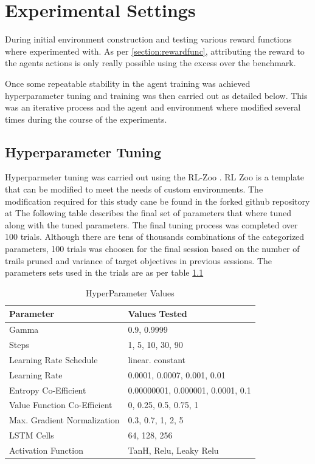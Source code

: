 \documentclass[oneside,12pt]{Classes/RoboticsLaTeX}
\begin{document}
\chapter{Experimental Settings} \label{chap:experimental}
During initial environment construction and testing various reward functions where experimented with. As per \ref{section:rewardfunc}, attributing the reward to the agents actions is only really possible using the excess over the benchmark. 

Once some repeatable stability in the agent training was achieved hyperparameter tuning and training was then carried out as detailed below. This was an iterative process and the agent and environment where modified several times during the course of the experiments.

\section{Hyperparameter Tuning}
Hyperparmeter tuning was carried out using the RL-Zoo \citep{rl-zoo}. RL Zoo is a template that can be modified to meet the needs of custom environments.  The modification required for this study cane be found in the forked github repository  at \citet{KeithBinesRLZoo2021}  The following table describes the final set of parameters that where tuned along with the tuned parameters. The final tuning process was completed over 100 trials. Although there are tens of thousands combinations of the categorized parameters, 100 trials was choosen for the final session based on the number of trails pruned and variance of target objectives in previous sessions. The parameters sets used in the trials are as per table \ref{table:hyperparamvals}

\begin{table} [h]
\begin{tabular}{|l|l|}
\hline
\textbf{Parameter} & \textbf{Values Tested }\\
\hline
Gamma & 0.9, 0.9999\\
Steps & 1, 5, 10, 30, 90\\
\hline
Learning Rate Schedule & linear. constant \\
\hline
Learning Rate & 0.0001, 0.0007, 0.001, 0.01\\
\hline
Entropy Co-Efficient & 0.00000001, 0.000001, 0.0001, 0.1\\
\hline
Value Function Co-Efficient & 0, 0.25, 0.5, 0.75, 1\\
\hline
Max. Gradient Normalization & 0.3, 0.7, 1, 2, 5\\
\hline
LSTM Cells & 64, 128, 256\\
\hline
Activation Function & TanH, Relu, Leaky Relu\\
\hline
\end{tabular}
\caption{HyperParameter Values} \label{table:hyperparamvals}
\end{table}
\end{document}
